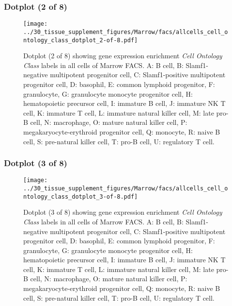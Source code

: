 \subsubsection{Dotplot (2 of 8)}
\begin{figure}[h]
\centering
\texttt{[image: ../30\_tissue\_supplement\_figures/Marrow/facs/allcells\_cell\_ontology\_class\_dotplot\_2-of-8.pdf]}

\caption{ Dotplot (2 of 8)  showing gene expression enrichment \emph{Cell Ontology Class} labels in all cells of Marrow FACS. A: B cell, B: Slamf1-negative multipotent progenitor cell, C: Slamf1-positive multipotent progenitor cell, D: basophil, E: common lymphoid progenitor, F: granulocyte, G: granulocyte monocyte progenitor cell, H: hematopoietic precursor cell, I: immature B cell, J: immature NK T cell, K: immature T cell, L: immature natural killer cell, M: late pro-B cell, N: macrophage, O: mature natural killer cell, P: megakaryocyte-erythroid progenitor cell, Q: monocyte, R: naive B cell, S: pre-natural killer cell, T: pro-B cell, U: regulatory T cell.}
\end{figure}


\clearpage

\subsubsection{Dotplot (3 of 8)}
\begin{figure}[h]
\centering
\texttt{[image: ../30\_tissue\_supplement\_figures/Marrow/facs/allcells\_cell\_ontology\_class\_dotplot\_3-of-8.pdf]}

\caption{ Dotplot (3 of 8)  showing gene expression enrichment \emph{Cell Ontology Class} labels in all cells of Marrow FACS. A: B cell, B: Slamf1-negative multipotent progenitor cell, C: Slamf1-positive multipotent progenitor cell, D: basophil, E: common lymphoid progenitor, F: granulocyte, G: granulocyte monocyte progenitor cell, H: hematopoietic precursor cell, I: immature B cell, J: immature NK T cell, K: immature T cell, L: immature natural killer cell, M: late pro-B cell, N: macrophage, O: mature natural killer cell, P: megakaryocyte-erythroid progenitor cell, Q: monocyte, R: naive B cell, S: pre-natural killer cell, T: pro-B cell, U: regulatory T cell.}
\end{figure}


\clearpage

